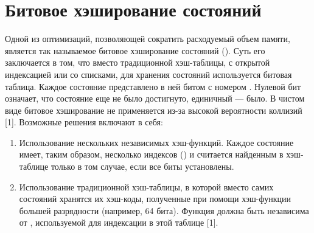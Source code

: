\section{Битовое хэширование состояний}
\label{sec:bit-hashing}

Одной из оптимизаций, позволяющей сократить расходуемый объем памяти,
является так называемое битовое хэширование состояний (). Суть его заключается в том, что вместо традиционной
хэш-таблицы, с открытой индексацией или со списками, для хранения
состояний используется битовая таблица. Каждое состояние 
представлено в ней битом с номером . Нулевой бит означает,
что состояние еще не было достигнуто, единичный — было. В чистом виде
битовое хэширование не применяется из-за высокой вероятности коллизий
[1]. Возможные решения включают в себя:

\begin{enumerate}
\item Использование нескольких независимых хэш-функций. Каждое
  состояние имеет, таким образом, несколько индексов () и считается найденным в
  хэш-таблице только в том случае, если все биты 
  установлены.

\item Использование традиционной хэш-таблицы, в которой вместо самих
  состояний хранятся их хэш-коды, полученные при помощи хэш-функции
   большей разрядности (например, 64 бита). Функция 
  должна быть независима от , используемой для индексации в этой
  таблице [1].
\end{enumerate}


